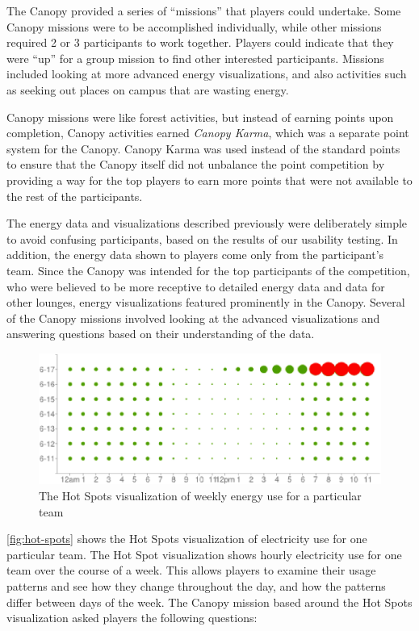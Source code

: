 \documentclass{sigchi}
\begin{document}
The Canopy provided a series of ``missions'' that players could undertake. Some Canopy missions were to be accomplished individually, while other missions required 2 or 3 participants to work together. Players could indicate that they were ``up'' for a group mission to find other interested participants. Missions included looking at more advanced energy visualizations, and also activities such as seeking out places on campus that are wasting energy.

Canopy missions were like forest activities, but instead of earning points upon completion, Canopy activities earned \emph{Canopy Karma}, which was a separate point system for the Canopy. Canopy Karma was used instead of the standard points to ensure that the Canopy itself did not unbalance the point competition by providing a way for the top players to earn more points that were not available to the rest of the participants.

The energy data and visualizations described previously were deliberately simple to avoid confusing participants, based on the results of our usability testing. In addition, the energy data shown to players come only from the participant's team. Since the Canopy was intended for the top participants of the competition, who were believed to be more receptive to detailed energy data and data for other lounges, energy visualizations featured prominently in the Canopy. Several of the Canopy missions involved looking at the advanced visualizations and answering questions based on their understanding of the data.

\begin{figure}[!t]
\centering
\includegraphics[width=0.95\columnwidth]{hot-spots-crop.eps}
\caption{The Hot Spots visualization of weekly energy use for a particular team}
\label{fig:hot-spots}
\end{figure}

\autoref{fig:hot-spots} shows the Hot Spots visualization of electricity use for one particular team. The Hot Spot visualization shows hourly electricity use for one team over the course of a week. This allows players to examine their usage patterns and see how they change throughout the day, and how the patterns differ between days of the week. The Canopy mission based around the Hot Spots visualization asked players the following questions:
\end{document}
